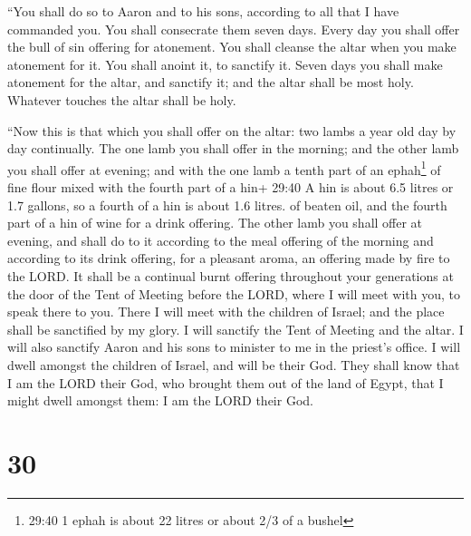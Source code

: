  ``You shall do so to Aaron and to his sons, according to
all that I have commanded you. You shall consecrate them seven days.
 Every day you shall offer the bull of sin offering for
atonement. You shall cleanse the altar when you make atonement for it.
You shall anoint it, to sanctify it.  Seven days you shall
make atonement for the altar, and sanctify it; and the altar shall be
most holy. Whatever touches the altar shall be holy.

 ``Now this is that which you shall offer on the altar: two
lambs a year old day by day continually.  The one lamb you
shall offer in the morning; and the other lamb you shall offer at
evening;  and with the one lamb a tenth part of an
ephah\footnote{29:40 1 ephah is about 22 litres or about 2/3 of a bushel}
of fine flour mixed with the fourth part of a hin+ 29:40 A hin is about
6.5 litres or 1.7 gallons, so a fourth of a hin is about 1.6 litres. of
beaten oil, and the fourth part of a hin of wine for a drink offering.
 The other lamb you shall offer at evening, and shall do to
it according to the meal offering of the morning and according to its
drink offering, for a pleasant aroma, an offering made by fire to the
LORD.  It shall be a continual burnt offering throughout
your generations at the door of the Tent of Meeting before the LORD,
where I will meet with you, to speak there to you.  There I
will meet with the children of Israel; and the place shall be sanctified
by my glory.  I will sanctify the Tent of Meeting and the
altar. I will also sanctify Aaron and his sons to minister to me in the
priest's office.  I will dwell amongst the children of
Israel, and will be their God.  They shall know that I am
the LORD their God, who brought them out of the land of Egypt, that I
might dwell amongst them: I am the LORD their God.

\hypertarget{section-29}{%
\section{30}\label{section-29}}

